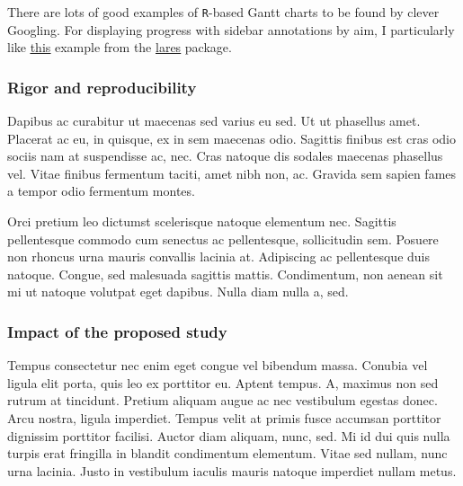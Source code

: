 \documentclass[11pt,]{article}
\begin{document}
There are lots of good examples of \texttt{R}-based Gantt charts to be
found by clever Googling. For displaying progress with sidebar
annotations by aim, I particularly like
\href{https://datascienceplus.com/visualize-your-cvs-timeline-with-r-gantt-style/}{\underline{this}}
example from the
\href{https://github.com/laresbernardo/lares}{\underline{lares}}
package.

\hypertarget{rigor-and-reproducibility}{%
\subsubsection{Rigor and
reproducibility}\label{rigor-and-reproducibility}}

Dapibus ac curabitur ut maecenas sed varius eu sed. Ut ut phasellus
amet. Placerat ac eu, in quisque, ex in sem maecenas odio. Sagittis
finibus est cras odio sociis nam at suspendisse ac, nec. Cras natoque
dis sodales maecenas phasellus vel. Vitae finibus fermentum taciti, amet
nibh non, ac. Gravida sem sapien fames a tempor odio fermentum montes.

Orci pretium leo dictumst scelerisque natoque elementum nec. Sagittis
pellentesque commodo cum senectus ac pellentesque, sollicitudin sem.
Posuere non rhoncus urna mauris convallis lacinia at. Adipiscing ac
pellentesque duis natoque. Congue, sed malesuada sagittis mattis.
Condimentum, non aenean sit mi ut natoque volutpat eget dapibus. Nulla
diam nulla a, sed.

\hypertarget{impact-of-the-proposed-study}{%
\subsubsection{Impact of the proposed
study}\label{impact-of-the-proposed-study}}

Tempus consectetur nec enim eget congue vel bibendum massa. Conubia vel
ligula elit porta, quis leo ex porttitor eu. Aptent tempus. A, maximus
non sed rutrum at tincidunt. Pretium aliquam augue ac nec vestibulum
egestas donec. Arcu nostra, ligula imperdiet. Tempus velit at primis
fusce accumsan porttitor dignissim porttitor facilisi. Auctor diam
aliquam, nunc, sed. Mi id dui quis nulla turpis erat fringilla in
blandit condimentum elementum. Vitae sed nullam, nunc urna lacinia.
Justo in vestibulum iaculis mauris natoque imperdiet nullam metus.


\end{document}
